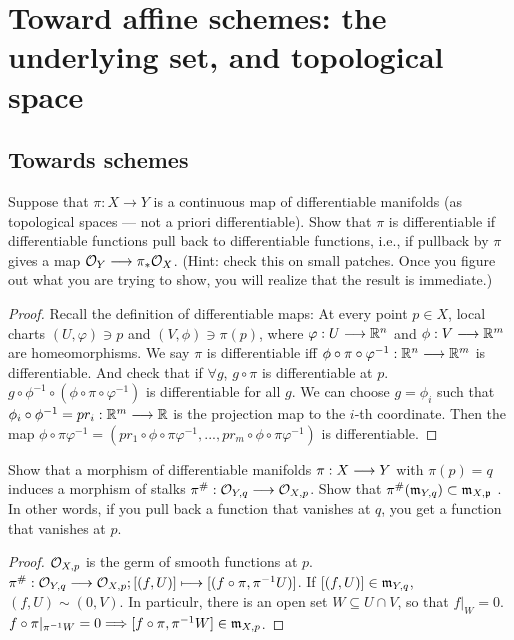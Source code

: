 \chapter{Toward affine schemes: the underlying set, and topological space}
% 
%
\section{Towards schemes}
\begin{exr}
Suppose that $\pi: X\longrightarrow Y$ is a continuous map of differentiable manifolds (as topological spaces — not a priori differentiable). Show that $\pi$ is differentiable if differentiable functions pull back to differentiable functions, i.e., if pullback by $\pi$ gives a map ${\cal O}_Y \longrightarrow \pi_*{\cal O}_X$. (Hint: check this on small patches. Once you figure out what you are trying to show, you will realize that the result is immediate.)
\end{exr}
\begin{proof}
Recall the definition of differentiable maps: At every point $p\in X$, local charts $(U,\varphi)\ni p$ and $(V,\phi)\ni \pi(p)$, where $\varphi: U\longrightarrow \mathbb R^n$ and $\phi:V\longrightarrow \mathbb R^m$ are homeomorphisms. We say $\pi$ is differentiable iff $\phi\circ\pi\circ\varphi^{-1}:\mathbb R^n\longrightarrow \mathbb R^m$ is differentiable. And check that if $\forall g$, $g\circ \pi$ is differentiable at $p$. $g\circ \phi^{-1}\circ(\phi\circ \pi\circ \varphi^{-1})$ is differentiable for all $g$. We can choose $g=\phi_i$ such that $\phi_i\circ \phi^{-1}=pr_i:\mathbb R^m\longrightarrow\mathbb R$ is the projection map to the $i$-th coordinate. Then the map $\phi\circ\pi\varphi^{-1}=(pr_1\circ\phi\circ\pi\varphi^{-1},...,pr_m\circ\phi\circ\pi\varphi^{-1})$ is differentiable.
\end{proof}

\begin{exr}
Show that a morphism of differentiable manifolds $\pi: X\longrightarrow Y$ with $\pi(p)=q$ induces a morphism of stalks $\pi^\#:{\cal O}_{Y,q}\longrightarrow {\cal O}_{X,p}$. Show that $\pi^\# ({\mathfrak m}_{Y,q})\subset {\mathfrak m}_{X,{\mathfrak p}}$ . In other words, if you pull back a function that vanishes at $q$, you get a function that vanishes at $p$. 
\end{exr}
\begin{proof}
${\cal O}_{X,p}$ is the germ of smooth functions at $p$. $\pi^{\#}:{\cal O}_{Y,q}\longrightarrow {\cal O}_{X,p}; [(f,U)]\longmapsto [(f\circ \pi, \pi^{-1} U)]$. If $[(f,U)]\in {\mathfrak m}_{Y,q}$, $(f,U)\sim (0, V) $. In particulr, there is an open set $W\subseteq U\cap V$, so that $f|_W=0$. $f\circ\pi|_{\pi^{-1}W}=0\Longrightarrow [f\circ\pi, \pi^{-1}W]\in {\mathfrak m}_{X,p}$.
\end{proof}
